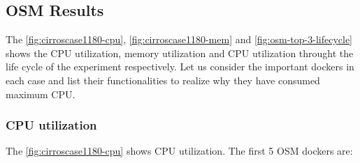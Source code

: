 \subsection{OSM Results}
The \ref{fig:cirroscase1180-cpu}, \ref{fig:cirroscase1180-mem} and \ref{fig:osm-top-3-lifecycle} shows the CPU utilization, memory utilization and CPU utilization throught the life cycle of the experiment respectively. Let us consider the important dockers in each case and list their functionalities to realize why they have consumed maximum CPU.

\subsubsection{CPU utilization}

The \ref{fig:cirroscase1180-cpu} shows CPU utilization. The first 5 OSM dockers are:

